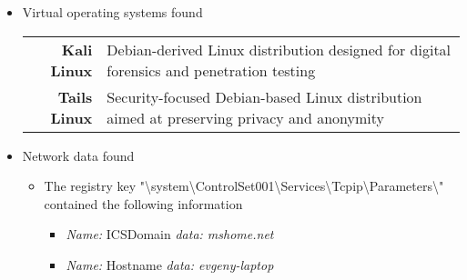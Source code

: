 \begin{enumerate}
\begin{itemize}
\begin{itemize}
		\item \textbf{Chromium}
		\begin{itemize}
			\item Examining chromium browser history located in "\textbackslash C:\textbackslash Users\textbackslash evgeny\textbackslash AppData\textbackslash Chromium\textbackslash User Data" using DB Browser for SQLite only one visited URL was found
			\begin{itemize}
				\item \begin{verbatim}
				http://www.palikan.com/?f=7&a=plk_frg01_15_37&cd=2XzuyEtN2Y1L1QzuyBtD0FtAzyyDyDyEzyyEtAtDtAtA0FtCtN0D0Tzu0StCtAyEyBtN1L2XzutAtFtCtBtFyDtFtDtN1L1Czu1StN1L1G1B1V1N2Y1L1Qzu2S0C0FtC0AzzyBzzyBtGzytB0F0EtGyEyBtDzytGzyyC0A0EtGtAyEtAtC0AtC0EtC0ByDyBzz2QtN1M1F1B2Z1V1N2Y1L1Qzu2Szz0EtD0DyByByB0EtG0AtC0AtAtGyEyDyB0CtGzztAtA0FtGtBtD0Czz0BzztC0CyEtC0FyD2QtN0A0LzuyE&cr=431249626&ir=&uref=chmm
				\end{verbatim}
			\end{itemize}
		\end{itemize}
		
		\item \textbf{Mozilla Firefox}
		\begin{itemize}
			\item Even though firefox ahs been run according to prefetch file. No internet history were found.
		\end{itemize}

		\end{itemize}
	
	\newpage
	\item Virtual operating systems found
	
	\begin{tabular}{|r|l|}
		\hline
		\textbf{Kali Linux} & Debian-derived Linux distribution designed for digital forensics and penetration testing \\
		\textbf{Tails Linux} & Security-focused Debian-based Linux distribution aimed at preserving privacy and anonymity \\
		\hline
	\end{tabular}

	\newpage
	\item Network data found
	
	\begin{itemize}
	
	\item The registry key "\textbackslash system\textbackslash ControlSet001\textbackslash Services\textbackslash Tcpip\textbackslash Parameters\textbackslash" contained the following information
	\begin{itemize}
		\item \textit{Name:} ICSDomain  \textit{data: mshome.net}
		\item \textit{Name:} Hostname  \textit{data: evgeny-laptop}
		

\end{itemize}
\end{itemize}
\end{itemize}
\end{enumerate}

